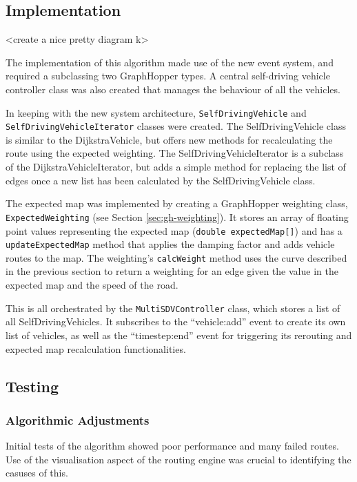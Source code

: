 \documentclass[ %
                    author={Alexander Hill},
                supervisor={Dr. Benjamin Sach},
                    degree={MEng},
                     title={MARMOSET},
                  subtitle={Multi-Agent Route Management using Online Simulation for Efficient Transportation},
                      type={research},
                      year={2016} ]{dissertation}
\begin{document}
\subsection{Implementation}

<create a nice pretty diagram k>

The implementation of this algorithm made use of the new event system, and
required a subclassing two GraphHopper types. A central self-driving vehicle
controller class was also created that manages the behaviour of all the
vehicles.

In keeping with the new system architecture, \texttt{SelfDrivingVehicle} and
\texttt{SelfDrivingVehicleIterator} classes were created. The SelfDrivingVehicle
class is similar to the DijkstraVehicle, but offers new methods for
recalculating the route using the expected weighting. The
SelfDrivingVehicleIterator is a subclass of the DijkstraVehicleIterator, but
adds a simple method for replacing the list of edges once a new list has been
calculated by the SelfDrivingVehicle class.

The expected map was implemented by creating a GraphHopper weighting class,
\texttt{ExpectedWeighting} (see Section \ref{sec:gh-weighting}). It stores an
array of floating point values representing the expected map (\texttt{double
expectedMap[]}) and has a \texttt{updateExpectedMap} method that applies the
damping factor and adds vehicle routes to the map. The weighting's
\texttt{calcWeight} method uses the curve described in the previous section to
return a weighting for an edge given the value in the expected map and the speed
of the road.

This is all orchestrated by the \texttt{MultiSDVController} class, which stores
a list of all SelfDrivingVehicles. It subscribes to the ``vehicle:add'' event
to create its own list of vehicles, as well as the ``timestep:end'' event for
triggering its rerouting and expected map recalculation functionalities.

\subsection{Testing}

\subsubsection{Algorithmic Adjustments}

Initial tests of the algorithm showed poor performance and many failed routes.
Use of the visualisation aspect of the routing engine was crucial to identifying
the casuses of this.
\end{document}
